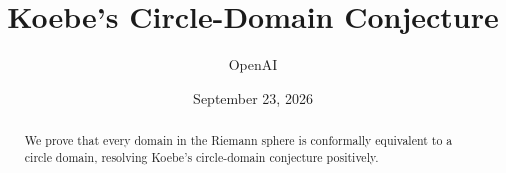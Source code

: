 \documentclass[11pt]{article}
\title{Koebe's Circle-Domain Conjecture}
\author{OpenAI}
\date{September 23, 2026}
\numberwithin{equation}{section}
\theoremstyle{definition}
\begin{document}
\maketitle
\begin{abstract}
We prove that every domain in the Riemann sphere is conformally equivalent
to a circle domain, resolving Koebe's circle-domain conjecture positively.
\end{abstract}

\clearpage
\tableofcontents
\clearpage
\suppressfloats[t]








\clearpage

\end{document}
